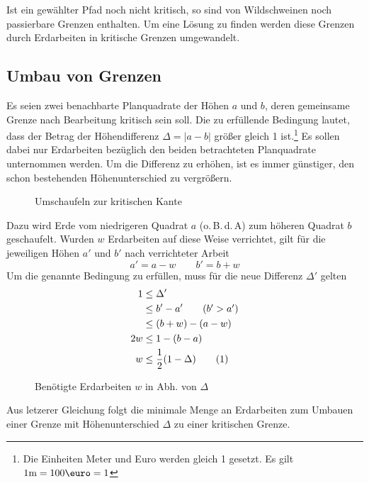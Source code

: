 \documentclass[a4paper, 12pt]{scrartcl}
\newcommand{\tagyoureit}{\addtocounter{equation}{1}\tag{\theequation}}
\begin{document}
Ist ein gewählter Pfad noch nicht kritisch, so sind von Wildschweinen noch passierbare Grenzen enthalten. Um eine Lösung zu finden werden diese Grenzen durch Erdarbeiten in kritische Grenzen umgewandelt.
\subsection{Umbau von Grenzen}
Es seien zwei benachbarte Planquadrate der Höhen $a$ und $b$, deren gemeinsame Grenze nach Bearbeitung kritisch sein soll. Die zu erfüllende Bedingung lautet, dass der Betrag der Höhendifferenz $\Delta = |a-b|$ größer gleich 1 ist.\footnote{Die Einheiten Meter und Euro werden gleich 1 gesetzt. Es gilt $1 \mathrm{m} = 100\text{\euro} = 1$} Es sollen dabei nur Erdarbeiten bezüglich den beiden betrachteten Planquadrate unternommen werden. Um die Differenz zu erhöhen, ist es immer günstiger, den schon bestehenden Höhenunterschied zu vergrößern.
\begin{figure}[H]
	\vspace{5cm}
	\caption{Umschaufeln zur kritischen Kante}
\end{figure}
Dazu wird Erde vom niedrigeren Quadrat $a$ (o.\,B.\,d.\,A) zum höheren Quadrat $b$ geschaufelt. Wurden $w$ Erdarbeiten auf diese Weise verrichtet, gilt für die jeweiligen Höhen $a'$ und $b'$ nach verrichteter Arbeit
\begin{equation*}
	a' = a - w \qquad b' = b + w
\end{equation*}
Um die genannte Bedingung zu erfüllen, muss für die neue Differenz $\Delta'$ gelten
\begin{align*}
	 1&\le \Delta'  \\
	 &\le b' - a' \tag{$b' > a'$}\\
	 &\le (b+w) - (a - w)\\
	 2w &\le 1 - (b-a)\\
	 w &\le \frac{1}{2}(1 - \Delta) \tagyoureit\label{eq:arbeit}
\end{align*}
\begin{figure}[H]
	\centering
	\vspace{4cm}
	\caption{Benötigte Erdarbeiten $w$ in Abh. von $\Delta$}
\end{figure}
Aus letzerer Gleichung folgt die minimale Menge an Erdarbeiten zum Umbauen einer Grenze mit Höhenunterschied $\Delta$ zu einer kritischen Grenze.
\end{document}
